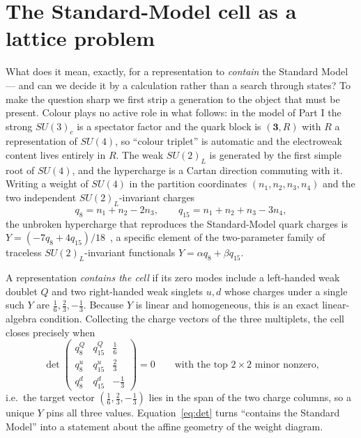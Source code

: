 \documentclass[11pt,a4paper]{article}
\begin{document}
\section{The Standard-Model cell as a lattice problem}\label{sec:cell}
What does it mean, exactly, for a representation to \emph{contain} the Standard Model ---
and can we decide it by a calculation rather than a search through states? To make the
question sharp we first strip a generation to the object that must be present.
Colour plays no active role in what follows: in the model of Part I the strong $SU(3)_c$
is a spectator factor and the quark block is $(\mathbf 3, R)$ with $R$ a representation of
$SU(4)$, so ``colour triplet'' is automatic and the electroweak content lives entirely in
$R$. The weak $SU(2)_L$ is generated by the first simple root of $SU(4)$, and the
hypercharge is a Cartan direction commuting with it. Writing a weight of $SU(4)$ in the
partition coordinates $(n_1,n_2,n_3,n_4)$ and the two independent $SU(2)_L$-invariant
charges
\[
q_8=n_1+n_2-2n_3,\qquad q_{15}=n_1+n_2+n_3-3n_4,
\]
the unbroken hypercharge that reproduces the Standard-Model quark charges is
$Y=(-7q_8+4q_{15})/18$~\cite{PartI}, a specific element of the two-parameter family of
traceless $SU(2)_L$-invariant functionals $Y=\alpha q_8+\beta q_{15}$.

A representation \emph{contains the cell} if its zero modes include a left-handed weak
doublet $Q$ and two right-handed weak singlets $u,d$ whose charges under a single such
$Y$ are $\tfrac16,\tfrac23,-\tfrac13$. Because $Y$ is linear and homogeneous, this is an
exact linear-algebra condition. Collecting the charge vectors of the three multiplets,
the cell closes precisely when
\begin{equation}\label{eq:det}
\det\!\begin{pmatrix} q_8^{Q} & q_{15}^{Q} & \tfrac16\\[2pt]
q_8^{u} & q_{15}^{u} & \tfrac23\\[2pt] q_8^{d} & q_{15}^{d} & -\tfrac13\end{pmatrix}=0
\qquad\text{with the top $2\times2$ minor nonzero,}
\end{equation}
i.e.\ the target vector $(\tfrac16,\tfrac23,-\tfrac13)$ lies in the span of the two charge
columns, so a unique $Y$ pins all three values. Equation~\eqref{eq:det} turns ``contains
the Standard Model'' into a statement about the affine geometry of the weight diagram.
\end{document}
